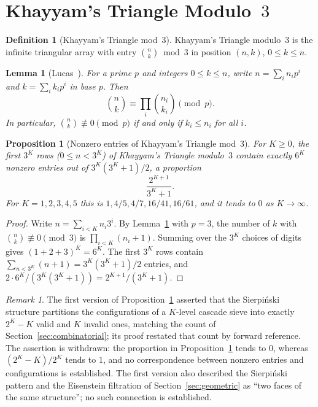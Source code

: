 \documentclass[12pt]{amsart}
\theoremstyle{plain}
\newtheorem{proposition}[theorem]{Proposition}
\newtheorem{lemma}[theorem]{Lemma}
\theoremstyle{definition}
\newtheorem{definition}[theorem]{Definition}
\theoremstyle{remark}
\newtheorem{remark}[theorem]{Remark}
\begin{document}
\section{Khayyam's Triangle Modulo~$3$}
\label{sec:khayyam}

\begin{definition}[Khayyam's Triangle mod~$3$]
Khayyam's Triangle modulo~$3$ is the infinite triangular array with entry
$\binom{n}{k} \bmod 3$ in position $(n,k)$, $0 \leq k \leq n$.
\end{definition}

\begin{lemma}[Lucas~\cite{Lucas1878}]
\label{lem:lucas}
For a prime $p$ and integers $0 \leq k \leq n$, write $n = \sum_i n_i p^i$ and
$k = \sum_i k_i p^i$ in base $p$. Then
\[
  \binom{n}{k} \equiv \prod_i \binom{n_i}{k_i} \pmod{p}.
\]
In particular, $\binom{n}{k} \not\equiv 0 \pmod{p}$ if and only if $k_i \leq
n_i$ for all $i$.
\end{lemma}

\begin{proposition}[Nonzero entries of Khayyam's Triangle mod~$3$]
\label{prop:khayyam-count}
For $K \geq 0$, the first $3^K$ rows ($0 \leq n < 3^K$) of Khayyam's Triangle
modulo~$3$ contain exactly $6^K$ nonzero entries out of $3^K(3^K+1)/2$, a
proportion
\[
  \frac{2^{K+1}}{3^K + 1}.
\]
For $K = 1, 2, 3, 4, 5$ this is $1, 4/5, 4/7, 16/41, 16/61$, and it tends to
$0$ as $K \to \infty$.
\end{proposition}

\begin{proof}
Write $n = \sum_{i<K} n_i 3^i$. By Lemma~\ref{lem:lucas} with $p=3$, the number
of $k$ with $\binom{n}{k} \not\equiv 0 \pmod{3}$ is $\prod_{i<K}(n_i+1)$.
Summing over the $3^K$ choices of digits gives $(1+2+3)^K = 6^K$. The first $3^K$
rows contain $\sum_{n<3^K}(n+1) = 3^K(3^K+1)/2$ entries, and
$2 \cdot 6^K/(3^K(3^K+1)) = 2^{K+1}/(3^K+1)$.
\end{proof}

\begin{remark}
\label{rem:two-faces}
The first version of Proposition~\ref{prop:khayyam-count} asserted that the
Sierpi\'nski structure partitions the configurations of a $K$-level cascade sieve
into exactly $2^K - K$ valid and $K$ invalid ones, matching the count of
Section~\ref{sec:combinatorial}; its proof restated that count by forward
reference. The assertion is withdrawn: the proportion in
Proposition~\ref{prop:khayyam-count} tends to $0$, whereas $(2^K - K)/2^K$ tends
to $1$, and no correspondence between nonzero entries and configurations is
established. The first version also described the Sierpi\'nski pattern and the
Eisenstein filtration of Section~\ref{sec:geometric} as ``two faces of the same
structure''; no such connection is established.
\end{remark}
\end{document}
